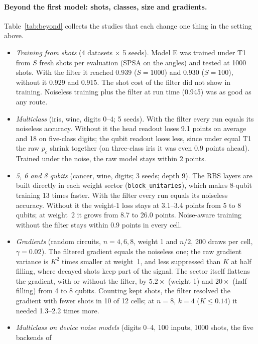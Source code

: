 \documentclass[11pt]{article}
\begin{document}
\paragraph{Beyond the first model: shots, classes, size and gradients.}\label{sec:beyond}
Table~\ref{tab:beyond} collects the studies that each change one thing in the setting above.
\begin{itemize}
\item \textit{Training from shots} (4 datasets $\times$ 5 seeds). Model E was trained under T1 from $S$ fresh shots per
  evaluation (SPSA on the angles) and tested at 1000 shots. With the filter it reached 0.939 ($S=1000$) and 0.930
  ($S=100$), without it 0.929 and 0.915. The shot cost of the filter did not show in training. Noiseless training
  plus the filter at run time (0.945) was as good as any route.
\item \textit{Multiclass} (iris, wine, digits 0--4; 5 seeds). With the filter every run equals its noiseless accuracy.
  Without it the head readout loses 9.1 points on average and 18 on five-class digits; the qubit readout loses less,
  since under equal T1 the raw $p_c$ shrink together (on three-class iris it was even 0.9 points ahead). Trained under
  the noise, the raw model stays within 2 points.
\item \textit{5, 6 and 8 qubits} (cancer, wine, digits; 3 seeds; depth 9). The RBS layers are built directly in each
  weight sector (\texttt{block\_unitaries}), which makes 8-qubit training 13 times faster. With the filter every run
  equals its noiseless accuracy. Without it the weight-1 loss stays at 3.1--3.4 points from 5 to 8 qubits; at weight~2
  it grows from 8.7 to 26.0 points. Noise-aware training without the filter stays within 0.9 points in every cell.
\item \textit{Gradients} (random circuits, $n=4,6,8$, weight 1 and $n/2$, 200 draws per cell, $\gamma=0.02$). The
  filtered gradient equals the noiseless one; the raw gradient variance is $K^2$ times smaller at weight~1, and less
  suppressed than $K$ at half filling, where decayed shots keep part of the signal. The sector itself flattens the
  gradient, with or without the filter, by $5.2\times$ (weight 1) and $20\times$ (half filling) from 4 to 8 qubits.
  Counting kept shots, the filter resolved the gradient with fewer shots in 10 of 12 cells; at $n=8$, $k=4$
  ($K\le0.14$) it needed 1.3--2.2 times more.
\item \textit{Multiclass on device noise models} (digits 0--4, 100 inputs, 1000 shots, the five backends of

\end{itemize}
\end{document}
